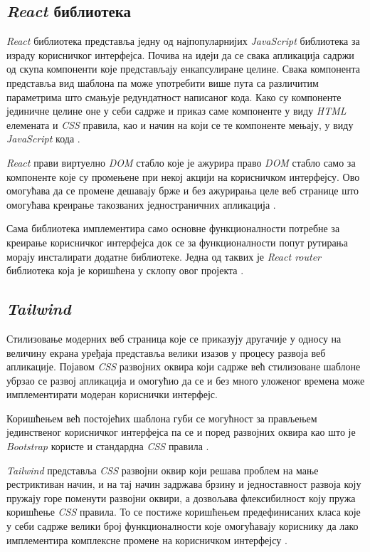 \documentclass[12pt,oneside]{memoir}
\begin{document}
\subsection{\textit{React} библиотека}
\textit{React} библиотека представља једну од најпопуларнијих \textit{JavaScript} библиотека за израду корисничког интерфејса.  Почива на идеји да се свака апликација садржи од скупа компоненти које представљају енкапсулиране целине. Свака компонента представља вид шаблона па може употребити више пута са различитим параметрима што смањује редундатност написаног кода. Како су компоненте јединичне целине оне у себи садрже и приказ саме компоненте у виду \textit{HTML} елемената и \textit{CSS} правила, као и начин на који се те компоненте мењају, у виду \textit{JavaScript} кода \cite{react}.

\textit{React} прави виртуелно \textit{DOM} стабло које је ажурира право \textit{DOM} стабло само за компоненте које су промењене при некој акцији на корисничком интерфејсу. Ово омогућава да се промене дешавају брже и без ажурирања целе веб странице што омогућава креирање такозваних једностраничних апликација \cite{react}. 

Сама библиотека имплементира само основне функционалности потребне за креирање корисничког интерфејса док се за функционалности попут рутирања морају инсталирати додатне библиотеке. Једна од таквих је \textit{React router} библиотека која је коришћена у склопу овог пројекта \cite{reactRouter}.

\subsection{\textit{Tailwind} }

Стилизовање модерних веб страница које се приказују другачије у односу на величину екрана уређаја представља велики изазов у процесу развоја веб апликације. Појавом \textit{CSS} развојних оквира који садрже већ стилизоване шаблоне убрзао се развој апликација и омогућио да се и без много уложеног времена може имплементирати модеран кориснички интерфејс.

Коришћењем већ постојећих шаблона губи се могућност за прављењем јединственог корисничког интерфејса па се и поред развојних оквира као што је \textit{Bootstrap} користе и стандардна \textit{CSS} правила \cite{bootstrap}.

\textit{Tailwind} представља \textit{CSS} развојни оквир који решава проблем на мање рестриктиван начин, и на тај начин задржава брзину и једноставност развоја коју пружају горе поменути развојни оквири, а дозвољава флексибилност коју пружа коришћење \textit{CSS} правила. То се постиже коришћењем предефинисаних класа које у себи садрже велики број функционалности које омогућавају кориснику да лако имплементира комплексне промене на корисничком интерфејсу \cite{tailwind}.
\end{document}

